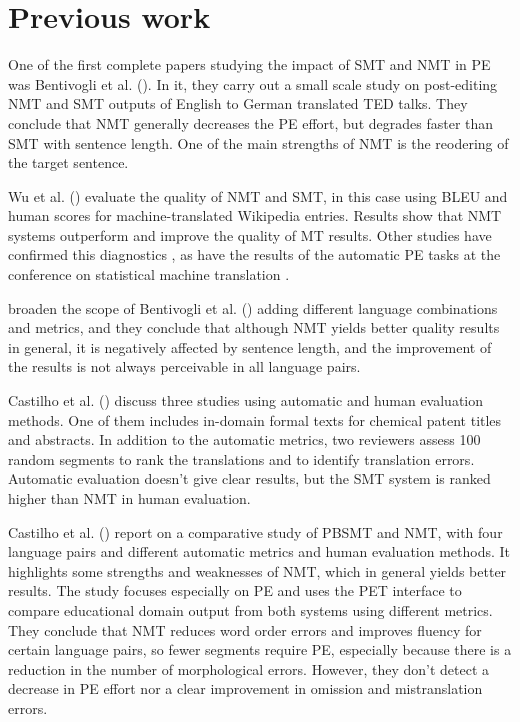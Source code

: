\documentclass[output=paper]{langsci/langscibook}
\begin{document}
\section{Previous work} \label{Previouswork}
One of the first complete papers studying the impact of SMT and NMT in PE was Bentivogli et al. (\citeyear{Bentivogli2016}). In it, they carry out a small scale study on post-editing
NMT and SMT outputs of English to German translated TED talks. They conclude that NMT generally decreases the PE effort, but degrades faster than SMT with sentence length. One of the main strengths of NMT is the reodering of the target sentence.

Wu et al. (\citeyear{Wu2016GooglesTranslation}) evaluate the quality of NMT and SMT, in this case using BLEU \citep{Papineni2002} and human scores for machine-translated Wikipedia entries. Results show that NMT systems outperform and improve the quality of MT results. Other studies have confirmed this diagnostics \citep{Junczys,IsabelleCF17}, as have the results of the automatic PE tasks at the conference on statistical machine translation \citep{Bojar2016,Bojar2017}. 

\citet{Toral2017} broaden the scope of Bentivogli et al. (\citeyear{Bentivogli2016}) adding different language combinations and metrics, and they conclude that although NMT yields better quality results in general, it is negatively affected by sentence length, and the improvement of the results is not always perceivable in all language pairs. 

Castilho et al. (\citeyear{Castilho2017IsArt}) discuss three studies using automatic and human evaluation methods. One of them includes in-domain formal texts for chemical patent titles and abstracts. In addition to the automatic metrics, two reviewers assess 100 random segments to rank the translations and to identify translation errors. Automatic evaluation doesn't give clear results, but the SMT system is ranked higher than NMT in human evaluation.

Castilho et al. (\citeyear{Castillo2017}) report on a comparative study of PBSMT and NMT, with four language pairs and different automatic metrics and human evaluation methods. It highlights some strengths and weaknesses of NMT, which in general yields better results. The study focuses especially on PE and uses the PET interface \citep{Aziz} to compare educational domain output from both systems using different metrics. They conclude that NMT reduces word order errors and improves fluency for certain language pairs, so fewer segments require PE, especially because there is a reduction in the number of morphological errors. However, they don't detect a decrease in PE effort nor a clear improvement in omission and mistranslation errors.
\end{document}
